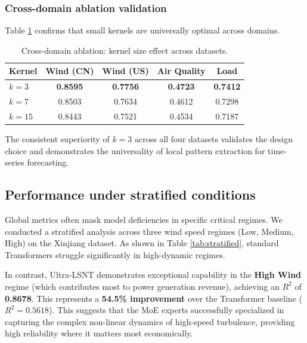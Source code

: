 \documentclass[review,3p,times,draft]{elsarticle}
\begin{document}
\subsubsection{Cross-domain ablation validation}
Table \ref{tab:ablation_cross} confirms that small kernels are universally optimal across domains.

\begin{table}[htbp]
\centering
\caption{Cross-domain ablation: kernel size effect across datasets.}
\label{tab:ablation_cross}
\begin{tabular}{@{}lcccc@{}}
\toprule
\textbf{Kernel} & \textbf{Wind (CN)} & \textbf{Wind (US)} & \textbf{Air Quality} & \textbf{Load} \\
\midrule
$k=3$ & \textbf{0.8595} & \textbf{0.7756} & \textbf{0.4723} & \textbf{0.7412} \\
$k=7$ & 0.8503 & 0.7634 & 0.4612 & 0.7298 \\
$k=15$ & 0.8443 & 0.7521 & 0.4534 & 0.7187 \\
\bottomrule
\end{tabular}
\end{table}

The consistent superiority of $k=3$ across all four datasets validates the design choice and demonstrates the universality of local pattern extraction for time-series forecasting.

\subsection{Performance under stratified conditions}
Global metrics often mask model deficiencies in specific critical regimes. We conducted a stratified analysis across three wind speed regimes (Low, Medium, High) on the Xinjiang dataset. As shown in Table \ref{tab:stratified}, standard Transformers struggle significantly in high-dynamic regimes.

In contrast, Ultra-LSNT demonstrates exceptional capability in the \textbf{High Wind} regime (which contributes most to power generation revenue), achieving an $R^2$ of \textbf{0.8678}. This represents a \textbf{54.5\% improvement} over the Transformer baseline ($R^2=0.5618$). This suggests that the MoE experts successfully specialized in capturing the complex non-linear dynamics of high-speed turbulence, providing high reliability where it matters most economically.
\end{document}
